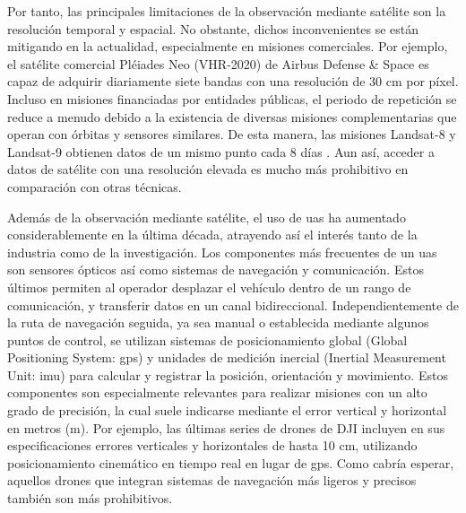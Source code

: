 Por tanto, las principales limitaciones de la observación mediante satélite son la resolución temporal y espacial. No obstante, dichos inconvenientes se están mitigando en la actualidad, especialmente en misiones comerciales. Por ejemplo, el satélite comercial Pléiades Neo (VHR-2020) de Airbus Defense \& Space \cite{airbus_pleiades_2021} es capaz de adquirir diariamente siete bandas con una resolución de 30 \si{\centi\meter} por píxel. Incluso en misiones financiadas por entidades públicas, el periodo de repetición se reduce a menudo debido a la existencia de diversas misiones complementarias que operan con órbitas y sensores similares. De esta manera, las misiones Landsat-8 y Landsat-9 obtienen datos de un mismo punto cada 8 días \cite{masek_landsat_2020}. Aun así, acceder a datos de satélite con una resolución elevada es mucho más prohibitivo en comparación con otras técnicas.

Además de la observación mediante satélite, el uso de \acrshort{uas} ha aumentado considerablemente en la última década, atrayendo así el interés tanto de la industria como de la investigación. Los componentes más frecuentes de un \acrshort{uas} son sensores ópticos así como sistemas de navegación y comunicación. Estos últimos permiten al operador desplazar el vehículo dentro de un rango de comunicación, y transferir datos en un canal bidireccional. Independientemente de la ruta de navegación seguida, ya sea manual o establecida mediante algunos puntos de control, se utilizan sistemas de posicionamiento global (Global Positioning System: \acrshort{gps}) y unidades de medición inercial (Inertial Measurement Unit: \acrshort{imu}) para calcular y registrar la posición, orientación y movimiento. Estos componentes son especialmente relevantes para realizar misiones con un alto grado de precisión, la cual suele indicarse mediante el error vertical y horizontal en metros (\si{\meter}). Por ejemplo, las últimas series de drones de DJI incluyen en sus especificaciones errores verticales y horizontales de hasta 10 \si{\centi\meter}, utilizando posicionamiento cinemático en tiempo real en lugar de \acrshort{gps}. Como cabría esperar, aquellos drones que integran sistemas de navegación más ligeros y precisos también son más prohibitivos.    

